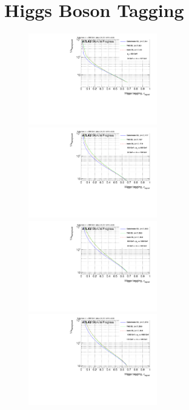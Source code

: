 \section{Higgs Boson Tagging}
\begin{figure}
\includegraphics[width=0.5\textwidth]{sascha_input/Appendix/Higgs_best/ROC_ALL_h_recoJet_D2_17_bin1.pdf} \hspace{1mm}
\includegraphics[width=0.5\textwidth]{sascha_input/Appendix/Higgs_best/ROC_ALL_h_recoJet_D2_17_bin2.pdf}
\bigskip
\includegraphics[width=0.5\textwidth]{sascha_input/Appendix/Higgs_best/ROC_ALL_h_recoJet_D2_17_bin3.pdf} \hspace{1mm}
\includegraphics[width=0.5\textwidth]{sascha_input/Appendix/Higgs_best/ROC_ALL_h_recoJet_D2_17_bin4.pdf}

\end{figure}
